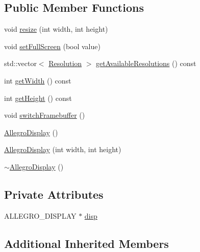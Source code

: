 \subsection*{Public Member Functions}
\begin{DoxyCompactItemize}
\item 
void \hyperlink{classZeta_1_1AllegroDisplay_a0eec86886654b8c7fa824e0f1a60c666}{resize} (int width, int height)
\item 
void \hyperlink{classZeta_1_1AllegroDisplay_a66c5cff25c281458c26e62e2a4298a9f}{set\+Full\+Screen} (bool value)
\item 
std\+::vector$<$ \hyperlink{classZeta_1_1Display_1_1Resolution}{Resolution} $>$ \hyperlink{classZeta_1_1AllegroDisplay_a3e6075814fc06dd14c99f95f6981d46c}{get\+Available\+Resolutions} () const 
\item 
int \hyperlink{classZeta_1_1AllegroDisplay_a235298ad063c22b30a1086d5cd442ad9}{get\+Width} () const 
\item 
int \hyperlink{classZeta_1_1AllegroDisplay_a9b876ad99147faae16f98ddfa44edf90}{get\+Height} () const 
\item 
void \hyperlink{classZeta_1_1AllegroDisplay_ab008d06f28f31d2cda41622eb7d60c43}{switch\+Framebuffer} ()
\item 
\hyperlink{classZeta_1_1AllegroDisplay_adb8a26bec17d2b24956cf3a703aa0d7e}{Allegro\+Display} ()
\item 
\hyperlink{classZeta_1_1AllegroDisplay_a019ed5b16f4ec65446f20b7239dcce7e}{Allegro\+Display} (int width, int height)
\item 
\hyperlink{classZeta_1_1AllegroDisplay_a670536f0e93a8f0ad3460a40b78d5423}{$\sim$\+Allegro\+Display} ()
\end{DoxyCompactItemize}
\subsection*{Private Attributes}
\begin{DoxyCompactItemize}
\item 
A\+L\+L\+E\+G\+R\+O\+\_\+\+D\+I\+S\+P\+L\+A\+Y $\ast$ \hyperlink{classZeta_1_1AllegroDisplay_ae4e2198bfdb2680b78ae3ae1702f89ee}{disp}
\end{DoxyCompactItemize}
\subsection*{Additional Inherited Members}


